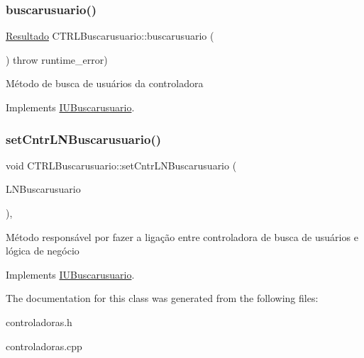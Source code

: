 \subsubsection{\texorpdfstring{buscarusuario()}{buscarusuario()}}
{\footnotesize\ttfamily \hyperlink{classResultado}{Resultado} C\+T\+R\+L\+Buscarusuario\+::buscarusuario (\begin{DoxyParamCaption}{ }\end{DoxyParamCaption}) throw  runtime\+\_\+error) \hspace{0.3cm}{\ttfamily [virtual]}}

Método de busca de usuários da controladora 

Implements \hyperlink{classIUBuscarusuario}{I\+U\+Buscarusuario}.

\mbox{\label{classCTRLBuscarusuario_afb7a2a586b958579f7a777b3d93da661}} 
\subsubsection{\texorpdfstring{set\+Cntr\+L\+N\+Buscarusuario()}{setCntrLNBuscarusuario()}}
{\footnotesize\ttfamily void C\+T\+R\+L\+Buscarusuario\+::set\+Cntr\+L\+N\+Buscarusuario (\begin{DoxyParamCaption}\item[{\hyperlink{classILNBuscarusuario}{I\+L\+N\+Buscarusuario} $\ast$}]{L\+N\+Buscarusuario }\end{DoxyParamCaption})\hspace{0.3cm}{\ttfamily [inline]}, {\ttfamily [virtual]}}

Método responsável por fazer a ligação entre controladora de busca de usuários e lógica de negócio 

Implements \hyperlink{classIUBuscarusuario}{I\+U\+Buscarusuario}.



The documentation for this class was generated from the following files\+:\begin{DoxyCompactItemize}
\item 
controladoras.\+h\item 
controladoras.\+cpp\end{DoxyCompactItemize}
